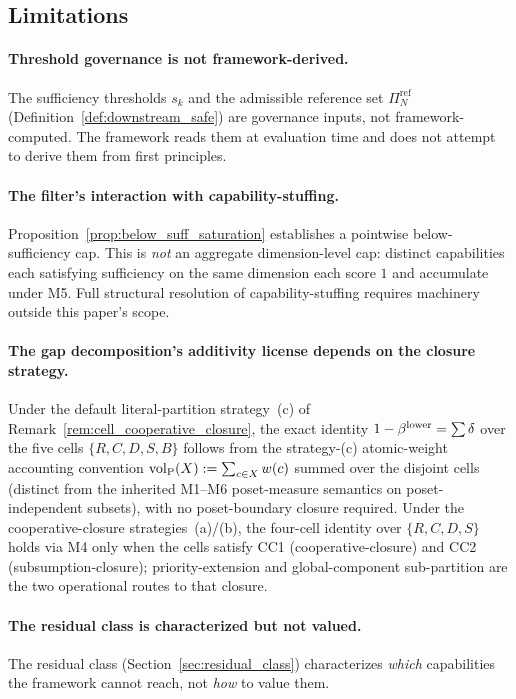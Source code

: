 \subsection{Limitations}

\paragraph{Threshold governance is not framework-derived.}
The sufficiency thresholds $s_k$ and the admissible
reference set $\Pi_N^{\mathrm{ref}}$
(Definition~\ref{def:downstream_safe}) are governance inputs,
not framework-computed.  The framework reads them at evaluation
time and does not attempt to derive them from first
principles.

\paragraph{The filter's interaction with capability-stuffing.}
Proposition~\ref{prop:below_suff_saturation} establishes a
pointwise below-sufficiency cap.  This is \emph{not} an
aggregate dimension-level cap: distinct capabilities each
satisfying sufficiency on the same dimension each score $1$
and accumulate under M5.  Full structural resolution of
capability-stuffing requires machinery outside this paper's
scope.

\paragraph{The gap decomposition's additivity license depends on
the closure strategy.}
Under the default literal-partition strategy~(c) of
Remark~\ref{rem:cell_cooperative_closure}, the exact identity
$1 - \beta^{\mathrm{lower}} = \sum \delta$ over the five cells
$\{R, C, D, S, B\}$ follows from the strategy-(c) atomic-weight
accounting convention ${\operatorname{vol}_{\mathrm{P}}}(X) := \sum_{c \in X} w(c)$
summed over the disjoint cells (distinct from the inherited
M1--M6 poset-measure semantics on poset-independent subsets),
with no poset-boundary closure required.
Under the cooperative-closure strategies~(a)/(b), the four-cell
identity over $\{R, C, D, S\}$ holds via M4 only when the cells
satisfy CC1 (cooperative-closure) and CC2 (subsumption-closure);
priority-extension and global-component sub-partition are the
two operational routes to that closure.

\paragraph{The residual class is characterized but not valued.}
The residual class (Section~\ref{sec:residual_class})
characterizes \emph{which} capabilities the framework cannot
reach, not \emph{how} to value them.

